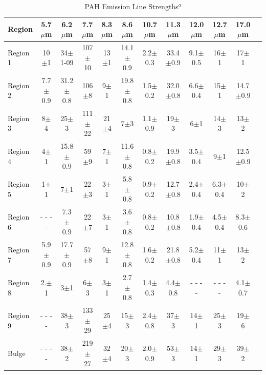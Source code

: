 \begin{table}
 \centering
 \begin{minipage}{200mm}
\caption{PAH Emission Line Strengths$^a$}
  \begin{tabular}{l c c  c  c  c  c  c  c  c  c c }
  \hline {Region  }&{5.7$\mu$m  }&{6.2$\mu$m  }&{7.7$\mu$m  }&{8.3$\mu$m  }&{8.6$\mu$m  }&{10.7$\mu$m  }&{11.3$\mu$m  }&{12.0$\mu$m  }&{12.7$\mu$m  }&{17.0$\mu$m  } 
   \\
 \hline



 Region 1 &10$\pm$1            & 34$\pm$1-09        & 107$\pm$10        & 13$\pm$1       & 14.1$\pm$0.9        & 2.2$\pm$0.3        & 33.4$\pm$0.9        & 9.1$\pm$0.5        & 16$\pm$1        & 17$\pm$1        \\
Region 2 &7.7$\pm$0.9        & 31.2$\pm$0.8        & 106$\pm$8        & 9$\pm$1           & 19.8$\pm$0.8        & 1.5$\pm$0.2        & 32.0$\pm$0.8        & 6.6$\pm$0.4        & 15$\pm$1        & 14.7$\pm$0.9        \\
Region 3 &8$\pm$4              & 25$\pm$3                & 111$\pm$22       & 21$\pm$4       & 7$\pm$3                 & 1.1$\pm$0.9        & 19$\pm$3             & 6$\pm$1             & 14$\pm$3           & 13$\pm$2        \\
Region 4 &4$\pm$1              & 15.8$\pm$0.9        & 59$\pm$9        & 7$\pm$1           & 11.6$\pm$0.8          & 0.8$\pm$0.2        & 19.9$\pm$0.8        & 3.5$\pm$0.4        & 9$\pm$1             & 12.5$\pm$0.9        \\
Region 5 &1$\pm$1              & 7$\pm$1                 & 22$\pm$3        & 3$\pm$1           & 5.8$\pm$0.8            & 0.9$\pm$0.2        & 12.7$\pm$0.8        & 2.4$\pm$0.4        & 6.3$\pm$0.4        & 10$\pm$2        \\
Region 6 & - - - -                      & 7.3$\pm$0.9         & 22$\pm$7        & 3$\pm$1            & 3.6$\pm$0.8            & 0.8$\pm$0.2        & 10.8$\pm$0.8        & 1.9$\pm$0.4        & 4.5$\pm$0.4        & 8.3$\pm$0.6        \\
Region 7 &5.9$\pm$0.9        & 17.7$\pm$0.9       & 57$\pm$8        & 9$\pm$1            & 12.8$\pm$0.8        & 1.6$\pm$0.2        & 21.8$\pm$0.8        & 5.2$\pm$0.4        & 11$\pm$1             & 13$\pm$2        \\
Region 8 &2.$\pm$1              & 3$\pm$1              & 6$\pm$3            & 3$\pm$1            & 2.7$\pm$0.8        & 1.4$\pm$0.3        & 4.4$\pm$0.8            & - - - -                      &  - - - -                       & 4.1$\pm$0.7        \\
Region 9 &  - - - -                     & 38$\pm$3          & 133$\pm$29        & 25$\pm$4        & 15$\pm$3            & 2.4$\pm$0.8        & 37$\pm$3               & 14$\pm$1             & 25$\pm$3        & 19$\pm$6        \\
Bulge       & - - - -                       & 38$\pm$2           & 219$\pm$27        & 32$\pm$4        & 20$\pm$3           & 2.0$\pm$0.9        & 53$\pm$3              & 14$\pm$1           & 29$\pm$3        & 39$\pm$2       \\


\end{tabular}
\end{minipage}
\end{table}

